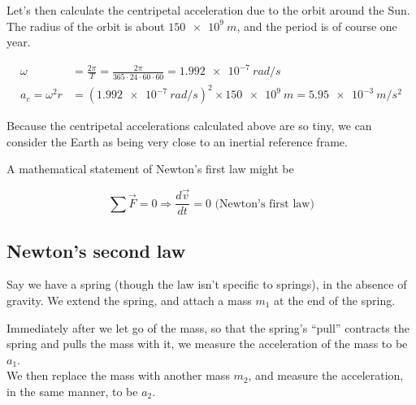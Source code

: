 Let's then calculate the centripetal acceleration due to the orbit around the Sun. The radius of the orbit is about $\SI{150e9}{m}$, and the period is of course one year.

\begin{align}
\omega &= \frac{2 \pi}{T} = \frac{2 \pi}{365 \cdot 24 \cdot 60 \cdot 60} = \SI{1.992e-7}{rad/s}\\
a_c = \omega^2 r &= (\SI{1.992e-7}{rad/s})^2 \times \SI{150e9}{m} = \SI{5.95e-3}{m/s^2}
\end{align}

Because the centripetal accelerations calculated above are so tiny, we can consider the Earth as being very close to an inertial reference frame.

A mathematical statement of Newton's first law might be

\begin{equation}
\sum \vec{F} = 0 \Rightarrow \frac{d\vec{v}}{dt} = 0 \text{ (Newton's first law)} \label{eq:newton1}
\end{equation}

\subsection{Newton's second law}

Say we have a spring (though the law isn't specific to springs), in the absence of gravity. We extend the spring, and attach a mass $m_1$ at the end of the spring.

\begin{figure}[H]
     \centering
{}
\end{figure}

Immediately after we let go of the mass, so that the spring's ``pull'' contracts the spring and pulls the mass with it, we measure the acceleration of the mass to be $a_1$.\\
We then replace the mass with another mass $m_2$, and measure the acceleration, in the same manner, to be $a_2$.

